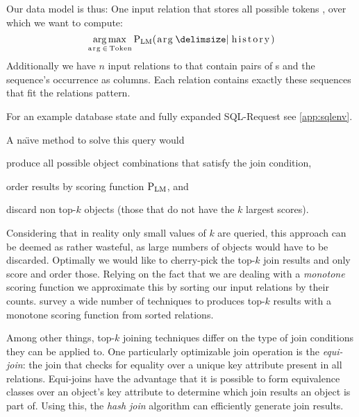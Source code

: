 
Our data model is thus: One input relation  that stores
all possible tokens , over which we want to compute:
\begin{equation}
  \Argmax{\text{\inlinecode{arg}} \, \in \, \text{\inlinecode{Token}}}
    \Prob[\text{LM}]{\text{\inlinecode{arg}}}{\text{\inlinecode{history}}}
\end{equation}
Additionally we have $n$ input relations
 to  that contain pairs
of s and the sequence's occurrence  as
columns.
Each  relation contains exactly these sequences that fit the
relations pattern.

For an example database state and fully expanded SQL-Request see
\cref{app:sqlenv}.

A na\"{\i}ve method to solve this query would
\begin{inparaenum}[(1)]
  \item produce all possible object combinations that satisfy the join
    condition,
  \item order results by scoring function $\Prob[\text{LM}]$, and
  \item discard non top-$k$ objects (those that do not have the $k$ largest
    scores).
\end{inparaenum}

Considering that in reality only small values of $k$ are queried, this approach
can be deemed as rather wasteful, as large numbers of objects would have to be
discarded.
Optimally we would like to cherry-pick the top-$k$ join results and only
score and order those.
Relying on the fact that we are dealing with a \emph{monotone} scoring function
we approximate this by sorting our input relations by their counts.
\textcite{Ilyas2008} survey a wide number of techniques to produces top-$k$ results
with a monotone scoring function from sorted relations.

Among other things, top-$k$ joining techniques differ on the type of join
conditions they can be applied to.
One particularly optimizable join operation is the \emph{equi-join}:
the join that checks for equality over a unique key attribute present in all
relations.
Equi-joins have the advantage that it is possible to form equivalence classes
over an object's key attribute to determine which join results an object is
part of.
Using this, the \emph{hash join} algorithm can efficiently generate join
results.

